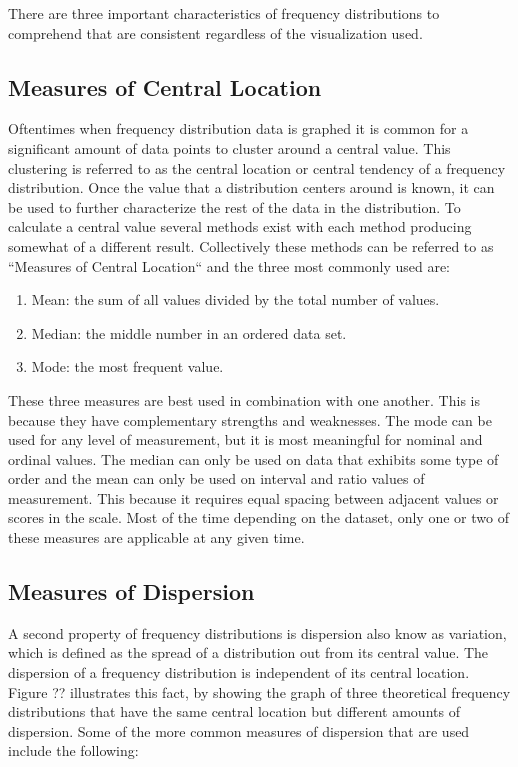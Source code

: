 There are three important characteristics of frequency distributions to comprehend
that are consistent regardless of the visualization used.

\subsection{Measures of Central Location}

Oftentimes when frequency distribution data is graphed it is common for a significant
amount of data points to cluster around a central value. This clustering is referred to
as the central location or central tendency of a frequency distribution. Once the 
value that a distribution centers around is known, it can be used to further 
characterize the rest of the data in the distribution. To calculate a central value 
several methods exist with each method producing somewhat of a different result. 
Collectively these methods can be referred to as ``Measures of Central Location`` 
and the three most commonly used are:

\begin{enumerate}
    \item Mean: the sum of all values divided by the total number of values.
    \item Median: the middle number in an ordered data set.
    \item Mode: the most frequent value.
\end{enumerate}

These three measures are best used in combination with one another. This is because 
they have complementary strengths and weaknesses. The mode can be used for any 
level of measurement, but it is most meaningful for nominal and ordinal values.
The median can only be used on data that exhibits some type of order and the mean 
can only be used on interval and ratio values of measurement. This because it requires 
equal spacing between adjacent values or scores in the scale. Most of the time 
depending on the dataset, only one or two of these measures are applicable at any 
given time.

\subsection{Measures of Dispersion}

A second property of frequency distributions is dispersion also know as variation, which 
is defined as the spread of a distribution out from its central value. The dispersion 
of a frequency distribution is independent of its central location. Figure ?? illustrates this 
fact, by showing the graph of three theoretical frequency distributions that have 
the same central location but different amounts of dispersion. Some of the more common
measures of dispersion that are used include the following:

